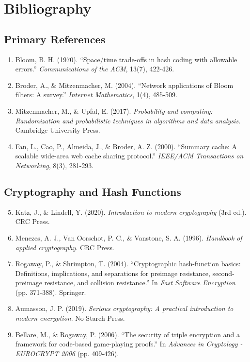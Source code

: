 \chapter*{Bibliography}

\section*{Primary References}

\begin{enumerate}
\item Bloom, B. H. (1970). ``Space/time trade-offs in hash coding with allowable errors.'' \textit{Communications of the ACM}, 13(7), 422-426.

\item Broder, A., \& Mitzenmacher, M. (2004). ``Network applications of Bloom filters: A survey.'' \textit{Internet Mathematics}, 1(4), 485-509.

\item Mitzenmacher, M., \& Upfal, E. (2017). \textit{Probability and computing: Randomization and probabilistic techniques in algorithms and data analysis}. Cambridge University Press.

\item Fan, L., Cao, P., Almeida, J., \& Broder, A. Z. (2000). ``Summary cache: A scalable wide-area web cache sharing protocol.'' \textit{IEEE/ACM Transactions on Networking}, 8(3), 281-293.
\end{enumerate}

\section*{Cryptography and Hash Functions}

\begin{enumerate}
\setcounter{enumi}{4}
\item Katz, J., \& Lindell, Y. (2020). \textit{Introduction to modern cryptography} (3rd ed.). CRC Press.

\item Menezes, A. J., Van Oorschot, P. C., \& Vanstone, S. A. (1996). \textit{Handbook of applied cryptography}. CRC Press.

\item Rogaway, P., \& Shrimpton, T. (2004). ``Cryptographic hash-function basics: Definitions, implications, and separations for preimage resistance, second-preimage resistance, and collision resistance.'' In \textit{Fast Software Encryption} (pp. 371-388). Springer.

\item Aumasson, J. P. (2019). \textit{Serious cryptography: A practical introduction to modern encryption}. No Starch Press.

\item Bellare, M., \& Rogaway, P. (2006). ``The security of triple encryption and a framework for code-based game-playing proofs.'' In \textit{Advances in Cryptology - EUROCRYPT 2006} (pp. 409-426).
\end{enumerate}

